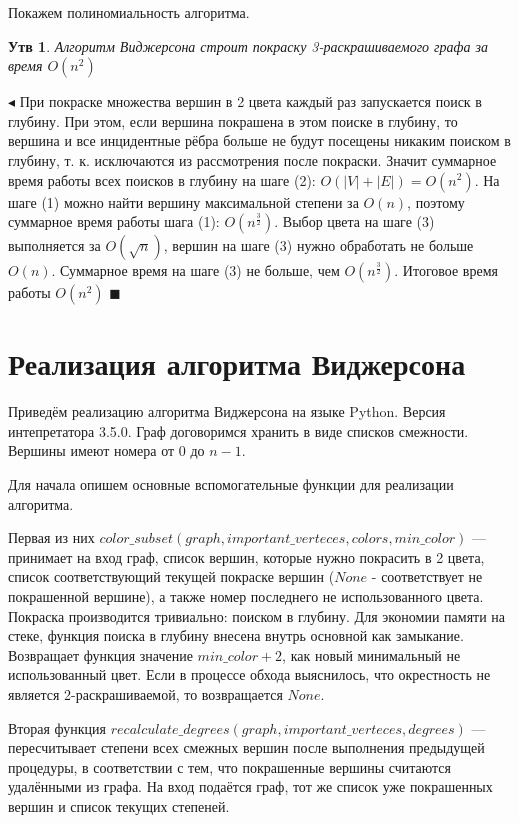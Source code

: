 \documentclass{article}
\newtheorem*{statement}{Утв}
\begin{document}
\bigskip

Покажем полиномиальность алгоритма.

\begin{statement}
Алгоритм Виджерсона строит покраску 3-раскрашиваемого графа за время $O(n^{2})$
\end{statement}
$\blacktriangleleft$
При покраске множества вершин в 2 цвета каждый раз запускается поиск в глубину. При этом, если вершина покрашена в этом поиске в глубину, то вершина и все инцидентные рёбра больше не будут посещены никаким поиском в глубину, т. к. исключаются из рассмотрения после покраски. Значит суммарное время работы всех поисков в глубину на шаге (2): $O(|V| + |E|) = O(n^2)$. На шаге (1) можно найти вершину максимальной степени за $O(n)$, поэтому суммарное время работы шага (1): $O(n^{\frac{3}{2}})$. Выбор цвета на шаге (3) выполняется за $O(\sqrt{n})$, вершин на шаге (3) нужно обработать не больше $O(n)$. Суммарное время на шаге (3) не больше, чем $O(n^{\frac{3}{2}})$. Итоговое время работы $O(n^2)$
$\blacksquare$

\section{Реализация алгоритма Виджерсона}

Приведём реализацию алгоритма Виджерсона на языке Python. Версия интепретатора 3.5.0. Граф договоримся хранить в виде списков смежности. Вершины имеют номера от 0 до $n-1$.


Для начала опишем основные вспомогательные функции для реализации алгоритма. 


Первая из них $color\_subset(graph, important\_verteces, colors, min\_color)$ --- принимает на вход граф, список вершин, которые нужно покрасить в 2 цвета, список соответствующий текущей покраске вершин ($None$ - соответствует не покрашенной вершине), а также номер последнего не использованного цвета. Покраска производится тривиально: поиском в глубину. Для экономии памяти на стеке, функция поиска в глубину внесена внутрь основной как замыкание. Возвращает функция значение $min\_color + 2$, как новый минимальный не использованный цвет. Если в процессе обхода выяснилось, что окрестность не является 2-раскрашиваемой, то возвращается $None$.

Вторая функция $recalculate\_degrees(graph, important\_verteces, degrees)$ --- пересчитывает степени всех смежных вершин после выполнения предыдущей процедуры, в соответствии с тем, что покрашенные вершины считаются удалёнными из графа. На вход подаётся граф, тот же список уже покрашенных вершин и список текущих степеней.
\end{document}
